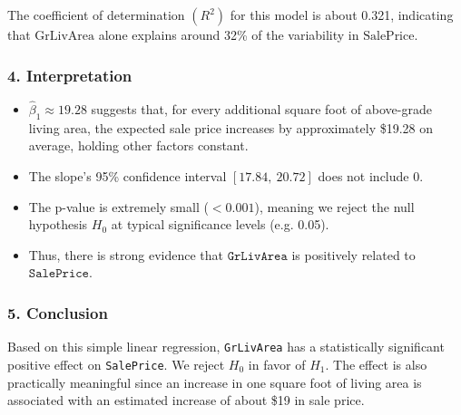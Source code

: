 \documentclass{article}
\begin{document}
The coefficient of determination \((R^2)\) for this model is about 0.321, indicating that \(\text{GrLivArea}\) alone explains around 32\% of the variability in \(\text{SalePrice}\).

\subsubsection*{4. Interpretation}
\begin{itemize}
    \item \(\hat{\beta}_1 \approx 19.28\) suggests that, for every additional square foot of above-grade living area, the expected sale price increases by approximately \$19.28 on average, holding other factors constant.
    \item The slope's 95\% confidence interval \([17.84,\ 20.72]\) does not include 0.
    \item The p-value is extremely small (\(< 0.001\)), meaning we reject the null hypothesis \(H_0\) at typical significance levels (e.g. 0.05).
    \item Thus, there is strong evidence that \(\texttt{GrLivArea}\) is positively related to \(\texttt{SalePrice}\).
\end{itemize}

\subsubsection*{5. Conclusion}
Based on this simple linear regression, \texttt{GrLivArea} has a statistically significant positive effect on \texttt{SalePrice}. We reject \(H_0\) in favor of \(H_1\). The effect is also practically meaningful since an increase in one square foot of living area is associated with an estimated increase of about \$19 in sale price.
\end{document}
